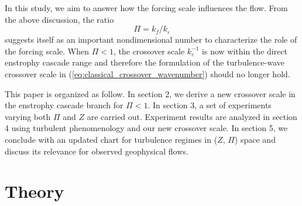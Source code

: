 \documentclass{ametsoc}
\begin{document}
In this study, we aim to answer how the forcing scale influences the
flow. From the above discussion, the ratio
\begin{equation}
\Pi=k_{f}/k_{\varepsilon}\label{eq:def_Pi_index}
\end{equation}
suggests itself as an important nondimensional number to characterize
the role of the forcing scale. When $\Pi<1$, the crossover scale $k_{\varepsilon}^{-1}$
is now within the direct enstrophy cascade range and therefore the formulation
of the turbulence-wave crossover scale in (\ref{eq:classical_crossover_wavenumber})
should no longer hold. 

This paper is organized
as follow. In section 2, we derive a new crossover scale in the
enstrophy cascade branch for $\Pi<1$. In section 3, a set of experiments
varying both $\Pi$ and $Z$ are carried out. Experiment results are
analyzed in section 4 using turbulent phenomenology
and our new crossover scale. In section 5, we conclude with an updated
chart for turbulence regimes in ($Z$, $\Pi$) space and discuss
its relevance for observed geophysical flows.


\section{Theory}
\end{document}
